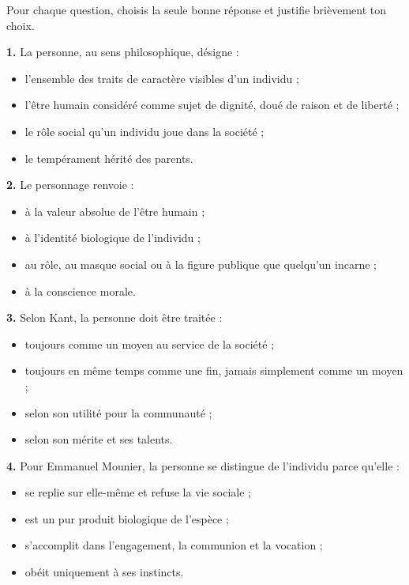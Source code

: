 \documentclass[11pt]{article}
\newcommand{\cle}[1]{{\popxbold\color{popdark}#1}}
\begin{document}
\begin{exercice}
Pour chaque question, choisis la seule bonne réponse et justifie brièvement ton choix.

\textbf{1.} La \cle{personne}, au sens philosophique, désigne :
\begin{itemize}
\item[a)] l'ensemble des traits de caractère visibles d'un individu ;
\item[b)] l'être humain considéré comme sujet de dignité, doué de raison et de liberté ;
\item[c)] le rôle social qu'un individu joue dans la société ;
\item[d)] le tempérament hérité des parents.
\end{itemize}

\textbf{2.} Le \cle{personnage} renvoie :
\begin{itemize}
\item[a)] à la valeur absolue de l'être humain ;
\item[b)] à l'identité biologique de l'individu ;
\item[c)] au rôle, au masque social ou à la figure publique que quelqu'un incarne ;
\item[d)] à la conscience morale.
\end{itemize}

\textbf{3.} Selon Kant, la personne doit être traitée :
\begin{itemize}
\item[a)] toujours comme un moyen au service de la société ;
\item[b)] toujours en même temps comme une fin, jamais simplement comme un moyen ;
\item[c)] selon son utilité pour la communauté ;
\item[d)] selon son mérite et ses talents.
\end{itemize}

\textbf{4.} Pour Emmanuel Mounier, la personne se distingue de l'individu parce qu'elle :
\begin{itemize}
\item[a)] se replie sur elle-même et refuse la vie sociale ;
\item[b)] est un pur produit biologique de l'espèce ;
\item[c)] s'accomplit dans l'engagement, la communion et la vocation ;
\item[d)] obéit uniquement à ses instincts.
\end{itemize}
\end{exercice}
\end{document}
